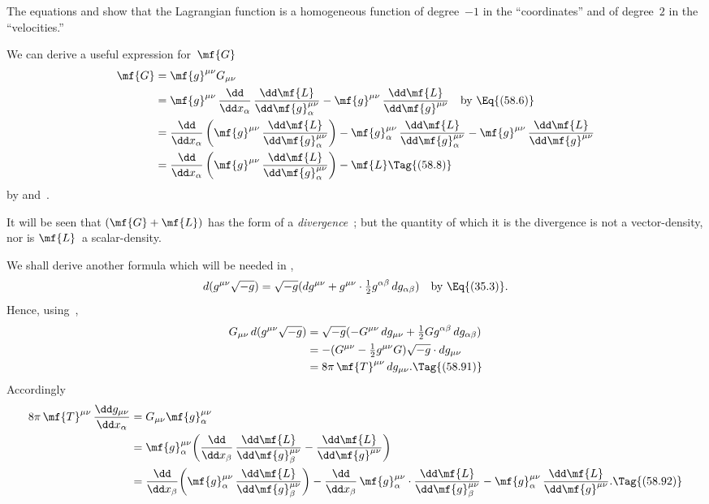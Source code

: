 \documentclass[12pt]{book}
\begin{document}
The equations  and  show that the Lagrangian function is a
homogeneous function of degree~$-1$ in the ``coordinates'' and of degree~$2$ in
the ``velocities.''

We can derive a useful expression for~$\mf{G}$
\begin{align*}
  \mf{G}
  &= \mf{g}^{\mu\nu} G_{\mu\nu} \\
  &= \mf{g}^{\mu\nu}\, \frac{\dd}{\dd x_{\alpha}}\, \frac{\dd\mf{L}}{\dd\mf{g}_{\alpha}^{\mu\nu}}
  - \mf{g}^{\mu\nu}\, \frac{\dd\mf{L}}{\dd\mf{g}^{\mu\nu}}\quad\text{by~\Eq{(58.6)}} \\
  &= \frac{\dd}{\dd x_{\alpha}} \left(\mf{g}^{\mu\nu}\, \frac{\dd\mf{L}}{\dd\mf{g}_{\alpha}^{\mu\nu}}\right)
  - \mf{g}_{\alpha}^{\mu\nu}\, \frac{\dd\mf{L}}{\dd\mf{g}_{\alpha}^{\mu\nu}}
  - \mf{g}^{\mu\nu}\, \frac{\dd\mf{L}}{\dd\mf{g}^{\mu\nu}} \\
  &= \frac{\dd}{\dd x_{\alpha}} \left(\mf{g}^{\mu\nu}\, \frac{\dd\mf{L}}{\dd\mf{g}_{\alpha}^{\mu\nu}}\right) - \mf{L}
  \Tag{(58.8)}
\end{align*}
by  and~.

It will be seen that $(\mf{G} + \mf{L})$ has the form of a \emph{divergence}~; but the
quantity of which it is the divergence is not a vector-density, nor is $\mf{L}$~a scalar-density.

We shall derive another formula which will be needed in ,
\[
d(g^{\mu\nu} \sqrt{-g})
= \sqrt{-g} (dg^{\mu\nu} + g^{\mu\nu} \cdot \tfrac{1}{2} g^{\alpha\beta}\, dg_{\alpha\beta})
\quad\text{by~\Eq{(35.3)}.}
\]
Hence, using~,
\begin{align*}
  G_{\mu\nu}\, d(g^{\mu\nu} \sqrt{-g})
  &= \sqrt{-g} (-G^{\mu\nu}\, dg_{\mu\nu} + \tfrac{1}{2} Gg^{\alpha\beta}\, dg_{\alpha\beta}) \\
  &= -(G^{\mu\nu} - \tfrac{1}{2}g^{\mu\nu}G) \sqrt{-g} \cdot dg_{\mu\nu} \\
  &= 8\pi\, \mf{T}^{\mu\nu}\, dg_{\mu\nu}.
  \Tag{(58.91)}
\end{align*}
Accordingly
\begin{align*}
  8\pi\, \mf{T}^{\mu\nu}\, \frac{\dd g_{\mu\nu}}{\dd x_{\alpha}}
  &= G_{\mu\nu} \mf{g}_{\alpha}^{\mu\nu} \\
  &= \mf{g}_{\alpha}^{\mu\nu} \biggl(
  \frac{\dd}{\dd x_{\beta}}\, \frac{\dd\mf{L}}{\dd\mf{g}_{\beta}^{\mu\nu}}
  - \frac{\dd\mf{L}}{\dd\mf{g}^{\mu\nu}}\biggr) \\
  &= \frac{\dd}{\dd x_{\beta}} \biggl(\mf{g}_{\alpha}^{\mu\nu}\, \frac{\dd\mf{L}}{\dd\mf{g}_{\beta}^{\mu\nu}}\biggr)
  - \frac{\dd}{\dd x_{\beta}}\, \mf{g}_{\alpha}^{\mu\nu} \cdot \frac{\dd\mf{L}}{\dd\mf{g}_{\beta}^{\mu\nu}}
  - \mf{g}_{\alpha}^{\mu\nu}\, \frac{\dd\mf{L}}{\dd\mf{g}^{\mu\nu}}.
  \Tag{(58.92)}
\end{align*}
\end{document}
